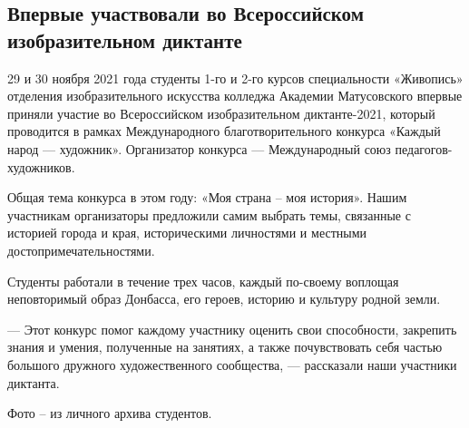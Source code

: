  
 
 
 
 
\subsection{Впервые участвовали во Всероссийском изобразительном диктанте}

29 и 30 ноября 2021 года студенты 1-го и 2-го курсов специальности «Живопись»
отделения изобразительного искусства колледжа Академии Матусовского впервые
приняли участие во Всероссийском изобразительном диктанте-2021, который
проводится в рамках Международного благотворительного конкурса «Каждый народ —
художник». Организатор конкурса — Международный союз педагогов-художников.


Общая тема конкурса в этом году: «Моя страна – моя история». Нашим участникам
организаторы предложили самим выбрать темы, связанные с историей города и края,
историческими личностями и местными достопримечательностями.

Студенты работали в течение трех часов, каждый по-своему воплощая неповторимый
образ Донбасса, его героев, историю и культуру родной земли.

— Этот конкурс помог каждому участнику оценить свои способности, закрепить
знания и умения, полученные на занятиях, а также почувствовать себя частью
большого дружного художественного сообщества, — рассказали наши участники
диктанта.

Фото – из личного архива студентов.

